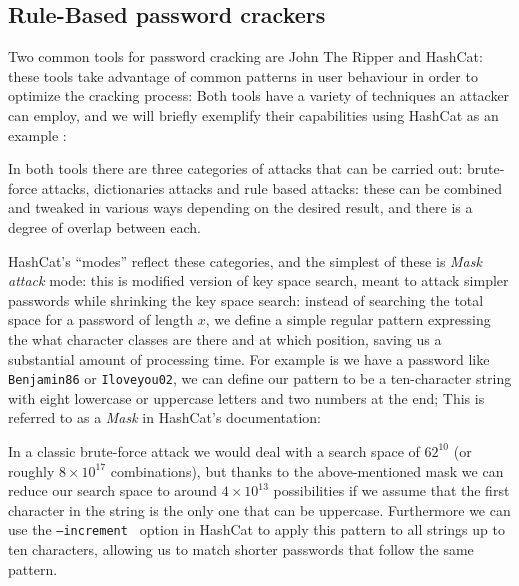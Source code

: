 
\subsection{Rule-Based password crackers} \label{hash_and_jtr}

Two common tools for password cracking are John The Ripper and \break \mbox{HashCat}\cite{john,hash_cat}: these tools take advantage of common patterns in user behaviour in order to optimize the cracking process: Both tools have a variety of techniques an attacker can employ, and we will briefly exemplify their capabilities using HashCat as an example \cite{hash_cat_wiki}: \newline

In both tools there are three categories of attacks that can be carried out: brute-force attacks, dictionaries attacks and rule based attacks: these can be combined and tweaked in various ways depending on the desired result, and there is a degree of overlap between each.\newline 

HashCat's \enquote{modes} reflect these categories, and the simplest of these is \emph{Mask attack} mode: this is modified version of key space search, meant to attack simpler passwords while shrinking the key space search: 
instead of searching the total space for a password of length $x$, we define a simple regular pattern expressing the what character classes are there and at which position, saving us a substantial amount of processing time.
For example is we have a password like \texttt{Benjamin86} or \texttt{Iloveyou02}, we can define our pattern to be a ten-character string with eight lowercase or uppercase letters and two numbers at the end; This is referred to as a \emph{Mask} in HashCat's documentation:

In a classic brute-force attack we would deal with a search space of $62^{10}$ (or roughly $8 \times 10^{17}$ combinations), but thanks to the above-mentioned mask we can reduce our search space to around $4 \times 10^{13}$ possibilities if we assume that the first character in the string is the only one that can be uppercase.
Furthermore we can use the \texttt{--increment } option in HashCat to apply this pattern to all strings up to ten characters, allowing us to match shorter passwords that follow the same pattern.

